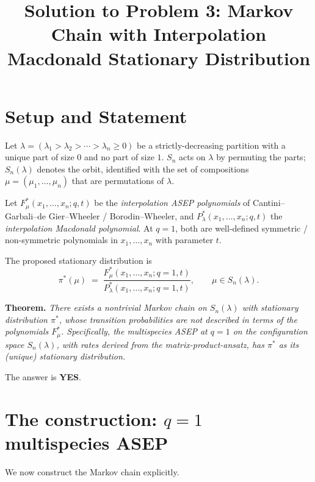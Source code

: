

\title{Solution to Problem 3: Markov Chain with Interpolation Macdonald Stationary Distribution}
\date{}


\maketitle

\section*{Setup and Statement}

Let $\lambda=(\lambda_1>\lambda_2>\cdots>\lambda_n\geq 0)$ be a strictly-decreasing partition with a unique part of size $0$ and no part of size $1$.  $S_n$ acts on $\lambda$ by permuting the parts; $S_n(\lambda)$ denotes the orbit, identified with the set of compositions $\mu=(\mu_1,\ldots,\mu_n)$ that are permutations of $\lambda$.

Let $F^*_\mu(x_1,\ldots,x_n;q,t)$ be the \emph{interpolation ASEP polynomials} of Cantini--Garbali--de Gier--Wheeler / Borodin--Wheeler, and $P^*_\lambda(x_1,\ldots,x_n;q,t)$ the \emph{interpolation Macdonald polynomial}.  At $q=1$, both are well-defined symmetric / non-symmetric polynomials in $x_1,\ldots,x_n$ with parameter $t$.

The proposed stationary distribution is
\[
\pi^*(\mu) \;=\; \frac{F^*_\mu(x_1,\ldots,x_n;q=1,t)}{P^*_\lambda(x_1,\ldots,x_n;q=1,t)},\qquad \mu\in S_n(\lambda).
\]

\medskip
\noindent\textbf{Theorem.}  \emph{There exists a nontrivial Markov chain on $S_n(\lambda)$ with stationary distribution $\pi^*$, whose transition probabilities are not described in terms of the polynomials $F^*_\mu$.  Specifically, the multispecies ASEP at $q=1$ on the configuration space $S_n(\lambda)$, with rates derived from the matrix-product-ansatz, has $\pi^*$ as its (unique) stationary distribution.}

\medskip
\noindent The answer is \textbf{YES}.

\section*{The construction: $q=1$ multispecies ASEP}

We now construct the Markov chain explicitly.

